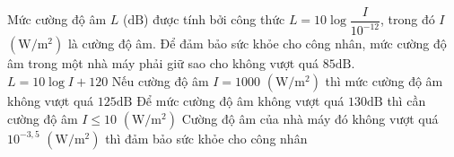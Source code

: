 \begin{ex}%
	Mức cường độ âm $L$ ($\mathrm{dB}$) được tính bởi công thức $L=10\log\dfrac{I}{10^{-12}}$, trong đó $I$ $\left(\mathrm{W}/\mathrm{m}^2\right)$ là cường độ âm. Để đảm bảo sức khỏe cho công nhân, mức cường độ âm trong một nhà máy phải giữ sao cho không vượt quá $85\mathrm{dB}$. %
	\choiceTF
	{\True $L=10\log I + 120$}
	{Nếu cường độ âm $I=1000$ $\left(\mathrm{W}/\mathrm{m}^2\right)$ thì mức cường độ âm không vượt quá $125\mathrm{dB}$}
	{\True Để mức cường độ âm không vượt quá $130\mathrm{dB}$ thì cần cường độ âm $I \le 10$ $\left(\mathrm{W}/\mathrm{m}^2\right)$}
	{\True Cường độ âm của nhà máy đó không vượt quá $10^{-3{,}5}$ $\left(\mathrm{W}/\mathrm{m}^2\right)$ thì đảm bảo sức khỏe cho công nhân}
\end{ex}


